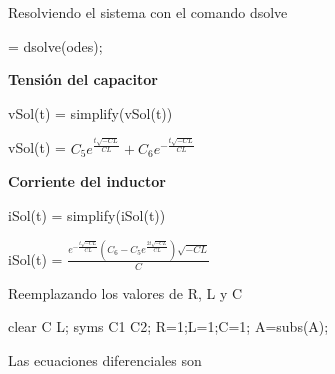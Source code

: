 \documentclass[10pt,a4paper]{article} %
\begin{document}
	\begin{par}
		\begin{flushleft}
			Resolviendo el sistema con el comando dsolve
		\end{flushleft}
	\end{par}
	
	\begin{matlabcode}
		 = dsolve(odes);
	\end{matlabcode}
	
	\begin{par}
		\begin{flushleft}
			\textbf{Tensión del capacitor}
		\end{flushleft}
	\end{par}
	
	\begin{matlabcode}
		vSol(t) = simplify(vSol(t))
	\end{matlabcode}
	\begin{matlabsymbolicoutput}
		vSol(t) = 
		$\displaystyle C_5  e^{\frac{t \sqrt{-C L}}{C L}} +C_6  e^{-\frac{t \sqrt{-C L}}{C L}} $
	\end{matlabsymbolicoutput}
	
	\begin{par}
		\begin{flushleft}
			\textbf{Corriente del inductor}
		\end{flushleft}
	\end{par}
	
	\begin{matlabcode}
		iSol(t) = simplify(iSol(t))
	\end{matlabcode}
	\begin{matlabsymbolicoutput}
		iSol(t) = 
		$\displaystyle \frac{e^{-\frac{t \sqrt{-C L}}{C L}}  {\left(C_6 -C_5  e^{\frac{2 t \sqrt{-C L}}{C L}} \right)} \sqrt{-C L}}{C}$
	\end{matlabsymbolicoutput}
	
	\begin{par}
		\begin{flushleft}
			Reemplazando los valores de R, L y C
		\end{flushleft}
	\end{par}
	
	\begin{matlabcode}
		clear C L;
		syms C1 C2;
		R=1;L=1;C=1;
		A=subs(A);
	\end{matlabcode}
	
	\begin{par}
		\begin{flushleft}
			Las ecuaciones diferenciales son
		\end{flushleft}
	\end{par}
	
\end{document}
